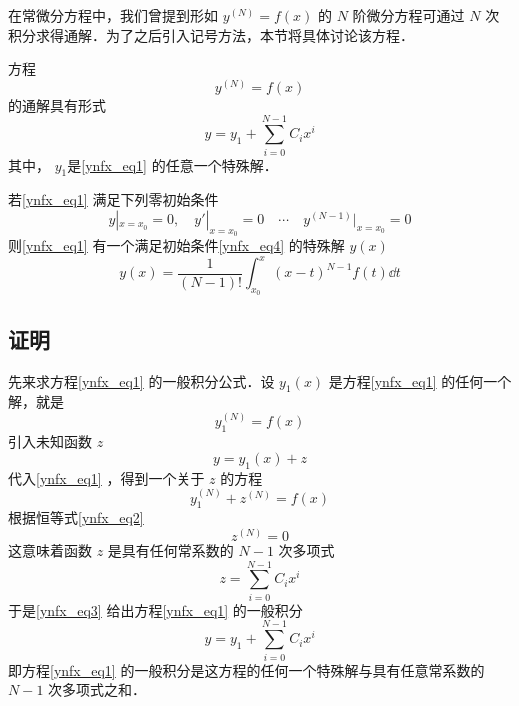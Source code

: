 在常微分方程中，我们曾提到形如 $y^{(N)}=f(x)$ 的 $N$ 阶微分方程可通过 $N$ 次积分求得通解．为了之后引入记号方法，本节将具体讨论该方程．

方程
\begin{equation}\label{ynfx_eq1}
y^{(N)}=f(x)
\end{equation}
的通解具有形式
\begin{equation}
y=y_1+\sum_{i=0}^{N-1}C_ix^i
\end{equation}
其中， $y_1$是\autoref{ynfx_eq1} 的任意一个特殊解．

若\autoref{ynfx_eq1} 满足下列零初始条件
\begin{equation}\label{ynfx_eq4}
y|_{x=x_0}=0,\quad y'|_{x=x_0}=0\quad\cdots \quad y^{(N-1)}|_{x=x_0}=0
\end{equation}
则\autoref{ynfx_eq1} 有一个满足初始条件\autoref{ynfx_eq4} 的特殊解 $y(x)$
\begin{equation}\label{ynfx_eq5}
y(x)=\frac{1}{(N-1)!}\int_{x_0}^x(x-t)^{N-1}f(t)\dd t
\end{equation}


\subsection{证明}
先来求方程\autoref{ynfx_eq1} 的一般积分公式．设 $y_1(x)$ 是方程\autoref{ynfx_eq1} 的任何一个解，就是
\begin{equation}\label{ynfx_eq2}
y_1^{(N)}=f(x)
\end{equation}
引入未知函数 $z$
\begin{equation}\label{ynfx_eq3}
y=y_1(x)+z
\end{equation}
代入\autoref{ynfx_eq1} ，得到一个关于 $z$ 的方程
\begin{equation}
y_1^{(N)}+z^{(N)}=f(x)
\end{equation}
根据恒等式\autoref{ynfx_eq2} 
\begin{equation}
z^{(N)}=0
\end{equation}
这意味着函数 $z$ 是具有任何常系数的 $N-1$ 次多项式
\begin{equation}
z=\sum_{i=0}^{N-1}C_ix^i
\end{equation}
于是\autoref{ynfx_eq3} 给出方程\autoref{ynfx_eq1} 的一般积分
\begin{equation}
y=y_1+\sum_{i=0}^{N-1}C_ix^i
\end{equation}
即方程\autoref{ynfx_eq1} 的一般积分是这方程的任何一个特殊解与具有任意常系数的 $N-1$ 次多项式之和．

